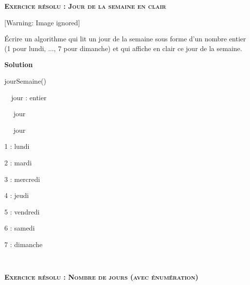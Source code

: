 {\sffamily
{}}


\bigskip

{\sffamily\bfseries\scshape
Exercice résolu : Jour de la semaine en clair}

\begin{center}
 [Warning: Image ignored] %

\end{center}
{
Écrire un algorithme qui lit un jour de la semaine sous forme
d'un nombre entier (1 pour lundi, ..., 7 pour
dimanche) et qui affiche en clair ce jour de la semaine.}

{\bfseries
Solution}

{\sffamily
{} jourSemaine()}

{\sffamily
\ \ jour : entier}

{\sffamily
\ \  jour}

{\sffamily
\ \  jour }

{\sffamily
\textstyleMotCl{\ \ \ \ }1 : 
{\textquotedbl}lundi{\textquotedbl}}

{\sffamily
\textstyleMotCl{\ \ \ \ }2 : 
{\textquotedbl}mardi{\textquotedbl}}

{\sffamily
\textstyleMotCl{\ \ \ \ }3 : 
{\textquotedbl}mercredi{\textquotedbl}}

{\sffamily
\textstyleMotCl{\ \ \ \ }4 : 
{\textquotedbl}jeudi{\textquotedbl}}

{\sffamily
\textstyleMotCl{\ \ \ \ }5 : 
{\textquotedbl}vendredi{\textquotedbl}}

{\sffamily
\textstyleMotCl{\ \ \ \ }6 : 
{\textquotedbl}samedi{\textquotedbl}}

{\sffamily
\textstyleMotCl{\ \ \ \ }7 : 
{\textquotedbl}dimanche{\textquotedbl}}

{\sffamily
\ \ }

{\sffamily
{} }


\bigskip


\bigskip


\bigskip


\bigskip

{\sffamily\bfseries\scshape
Exercice résolu : Nombre de jours (avec énumération)}


